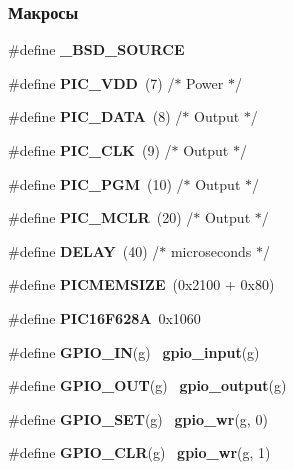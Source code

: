 \subsubsection*{Макросы}
\begin{DoxyCompactItemize}
\item 
\mbox{\label{rpp_8c_ad3d8a3bd0c0b677acef144f2c2ef6d73}} 
\#define {\bfseries \+\_\+\+B\+S\+D\+\_\+\+S\+O\+U\+R\+CE}
\item 
\mbox{\label{rpp_8c_a5ceef35fa2a177e2afe84595d17e9080}} 
\#define {\bfseries P\+I\+C\+\_\+\+V\+DD}~(7)   /$\ast$ Power $\ast$/
\item 
\mbox{\label{rpp_8c_a34a50b925af2dc910c30930b064d829f}} 
\#define {\bfseries P\+I\+C\+\_\+\+D\+A\+TA}~(8)    /$\ast$ Output $\ast$/
\item 
\mbox{\label{rpp_8c_ae8d43d893fd7f2bbe4a257f74ce031fd}} 
\#define {\bfseries P\+I\+C\+\_\+\+C\+LK}~(9)    /$\ast$ Output $\ast$/
\item 
\mbox{\label{rpp_8c_ab0bf17244c5384684983604c84f78760}} 
\#define {\bfseries P\+I\+C\+\_\+\+P\+GM}~(10)   /$\ast$ Output $\ast$/
\item 
\mbox{\label{rpp_8c_a33ce72ba760e86dde7110696ad0fd4ee}} 
\#define {\bfseries P\+I\+C\+\_\+\+M\+C\+LR}~(20)    /$\ast$ Output $\ast$/
\item 
\mbox{\label{rpp_8c_a62249e384b997229a3e2ae74ade334e2}} 
\#define {\bfseries D\+E\+L\+AY}~(40)   /$\ast$ microseconds $\ast$/
\item 
\mbox{\label{rpp_8c_acfa68c36d99623e2079a48f32eae3b25}} 
\#define {\bfseries P\+I\+C\+M\+E\+M\+S\+I\+ZE}~(0x2100 + 0x80)
\item 
\mbox{\label{rpp_8c_a076409eed1e2fff413e6681db65b9a63}} 
\#define {\bfseries P\+I\+C16\+F628A}~0x1060
\item 
\mbox{\label{rpp_8c_a4331b425be1a2ed4d42c797091d31ca0}} 
\#define {\bfseries G\+P\+I\+O\+\_\+\+IN}(g)~\textbf{ gpio\+\_\+input}(g)
\item 
\mbox{\label{rpp_8c_a94b8cd73d3399f3766dcb1b1a913ed24}} 
\#define {\bfseries G\+P\+I\+O\+\_\+\+O\+UT}(g)~\textbf{ gpio\+\_\+output}(g)
\item 
\mbox{\label{rpp_8c_adf627b9dcfcba2042a2052bef11fe771}} 
\#define {\bfseries G\+P\+I\+O\+\_\+\+S\+ET}(g)~\textbf{ gpio\+\_\+wr}(g, 0)
\item 
\mbox{\label{rpp_8c_ac174d27525caf4e7782859df2b719cc1}} 
\#define {\bfseries G\+P\+I\+O\+\_\+\+C\+LR}(g)~\textbf{ gpio\+\_\+wr}(g, 1)
\end{DoxyCompactItemize}
